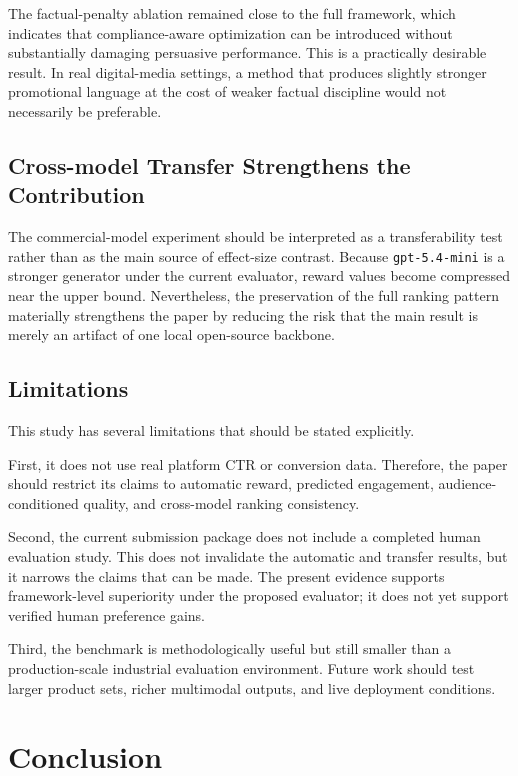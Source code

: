 \documentclass[preprint,12pt]{elsarticle}
\begin{document}
The factual-penalty ablation remained close to the full framework, which indicates that compliance-aware optimization can be introduced without substantially damaging persuasive performance. This is a practically desirable result. In real digital-media settings, a method that produces slightly stronger promotional language at the cost of weaker factual discipline would not necessarily be preferable.

\subsection{Cross-model Transfer Strengthens the Contribution}

The commercial-model experiment should be interpreted as a transferability test rather than as the main source of effect-size contrast. Because \texttt{gpt-5.4-mini} is a stronger generator under the current evaluator, reward values become compressed near the upper bound. Nevertheless, the preservation of the full ranking pattern materially strengthens the paper by reducing the risk that the main result is merely an artifact of one local open-source backbone.

\subsection{Limitations}

This study has several limitations that should be stated explicitly.

First, it does not use real platform CTR or conversion data. Therefore, the paper should restrict its claims to automatic reward, predicted engagement, audience-conditioned quality, and cross-model ranking consistency.

Second, the current submission package does not include a completed human evaluation study. This does not invalidate the automatic and transfer results, but it narrows the claims that can be made. The present evidence supports framework-level superiority under the proposed evaluator; it does not yet support verified human preference gains.

Third, the benchmark is methodologically useful but still smaller than a production-scale industrial evaluation environment. Future work should test larger product sets, richer multimodal outputs, and live deployment conditions.

\section{Conclusion}
\end{document}
